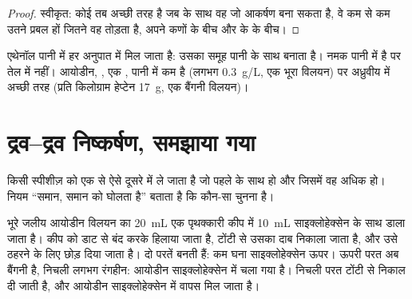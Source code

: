 \begin{proof}
स्वीकृत: कोई  तब अच्छी तरह  है जब  के साथ वह जो आकर्षण बना
सकता है, वे कम से कम उतने प्रबल हों जितने वह तोड़ता है, अपने कणों के बीच
और  के  के बीच।
\end{proof}

\begin{example}[तीन स्थितियाँ]\label{ex:g11:dissolution:cases}
एथेनॉल पानी में हर अनुपात में मिल जाता है: उसका  समूह पानी के साथ
 बनाता है। नमक पानी में  है पर तेल में नहीं।
आयोडीन, , एक , पानी में कम  है (लगभग
\qty{0.3}{g/L}, एक भूरा विलयन) पर अध्रुवीय  में अच्छी तरह
(प्रति किलोग्राम हेप्टेन \qty{17}{g}, एक बैंगनी विलयन)।
\end{example}

\section{द्रव--द्रव निष्कर्षण, समझाया गया}

 किसी स्पीशीज़ को एक  से ऐसे दूसरे  में ले जाता
है जो पहले के साथ  हो और जिसमें वह अधिक  हो। नियम
``समान, समान को घोलता है'' बताता है कि कौन-सा  चुनना है।

\begin{inthelab}[आयोडीन का निष्कर्षण]
भूरे जलीय आयोडीन विलयन का \qty{20}{mL} एक पृथक्कारी कीप में
\qty{10}{mL} साइक्लोहेक्सेन के साथ डाला जाता है। कीप को डाट से बंद करके
हिलाया जाता है, टोंटी से उसका दाब निकाला जाता है, और उसे ठहरने के लिए छोड़ दिया
जाता है। दो परतें बनती हैं: कम घना साइक्लोहेक्सेन ऊपर। ऊपरी परत
अब बैंगनी है, निचली लगभग रंगहीन: आयोडीन साइक्लोहेक्सेन में चला गया
है। निचली परत टोंटी से निकाल दी जाती है, और
आयोडीन साइक्लोहेक्सेन में वापस मिल जाता है।
\end{inthelab}


